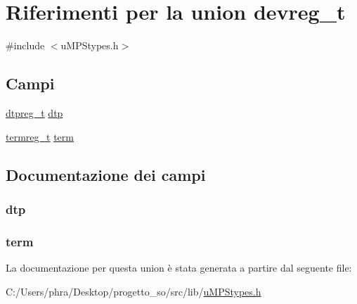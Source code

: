 \hypertarget{uniondevreg__t}{\section{Riferimenti per la union devreg\-\_\-t}
\label{uniondevreg__t}
}


{\ttfamily \#include $<$u\-M\-P\-Stypes.\-h$>$}

\subsection*{Campi}
\begin{DoxyCompactItemize}
\item 
\hyperlink{structdtpreg__t}{dtpreg\-\_\-t} \hyperlink{uniondevreg__t_a78e61f38ebbbb2b669e0cf6d6ea00d77}{dtp}
\item 
\hyperlink{structtermreg__t}{termreg\-\_\-t} \hyperlink{uniondevreg__t_a98298db6115a0ce0138af4474b6b9ad9}{term}
\end{DoxyCompactItemize}


\subsection{Documentazione dei campi}
\hypertarget{uniondevreg__t_a78e61f38ebbbb2b669e0cf6d6ea00d77}{
\subsubsection[{dtp}]{ dtp}}\label{uniondevreg__t_a78e61f38ebbbb2b669e0cf6d6ea00d77}
\hypertarget{uniondevreg__t_a98298db6115a0ce0138af4474b6b9ad9}{
\subsubsection[{term}]{ term}}\label{uniondevreg__t_a98298db6115a0ce0138af4474b6b9ad9}


La documentazione per questa union è stata generata a partire dal seguente file\-:\begin{DoxyCompactItemize}
\item 
C\-:/\-Users/phra/\-Desktop/progetto\-\_\-so/src/lib/\hyperlink{u_m_p_stypes_8h}{u\-M\-P\-Stypes.\-h}\end{DoxyCompactItemize}
